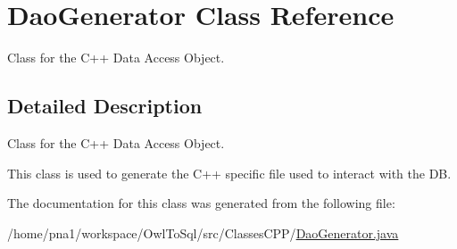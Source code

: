 \hypertarget{class_dao_generator}{
\section{DaoGenerator Class Reference}
\label{class_dao_generator}
}


Class for the C++ Data Access Object.  




\subsection{Detailed Description}
Class for the C++ Data Access Object. 

This class is used to generate the C++ specific file used to interact with the DB. 

The documentation for this class was generated from the following file:\begin{DoxyCompactItemize}
\item 
/home/pna1/workspace/OwlToSql/src/ClassesCPP/\hyperlink{_dao_generator_8java}{DaoGenerator.java}\end{DoxyCompactItemize}
